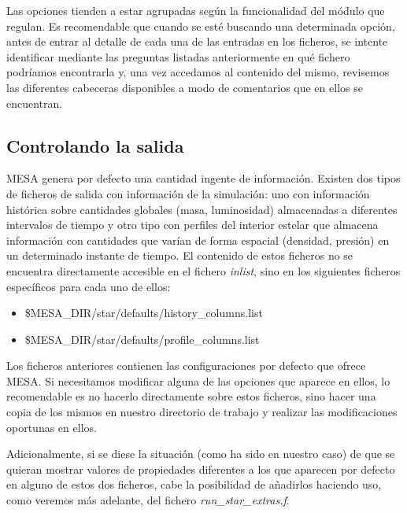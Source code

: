 Las opciones tienden a estar agrupadas según la funcionalidad del módulo que regulan. Es recomendable que cuando se esté buscando una determinada opción, antes de entrar al detalle de cada una de las entradas en los ficheros, se intente identificar mediante las preguntas listadas anteriormente en qué fichero podríamos encontrarla y, una vez accedamos al contenido del mismo, revisemos las diferentes cabeceras disponibles a modo de comentarios que en ellos se encuentran.\par

\subsection{Controlando la salida} \label{sec:ctrl_salida}
MESA genera por defecto una cantidad ingente de información. Existen dos tipos de ficheros de salida con información de la simulación: uno con información histórica sobre cantidades globales (masa, luminosidad) almacenadas a diferentes intervalos de tiempo y otro tipo con perfiles del interior estelar que almacena información con cantidades que varían de forma espacial (densidad, presión) en un determinado instante de tiempo. El contenido de estos ficheros no se encuentra directamente accesible en el fichero \textit{inlist}, sino en los siguientes ficheros específicos para cada uno de ellos:

\begin{itemize}
    \item \$MESA\_DIR/star/defaults/history\_columns.list
    \item \$MESA\_DIR/star/defaults/profile\_columns.list
\end{itemize}

Los ficheros anteriores contienen las configuraciones por defecto que ofrece MESA. Si necesitamos modificar alguna de las opciones que aparece en ellos, lo recomendable es no hacerlo directamente sobre estos ficheros, sino hacer una copia de los mismos en nuestro directorio de trabajo y realizar las modificaciones oportunas en ellos.\par

Adicionalmente, si se diese la situación (como ha sido en nuestro caso) de que se quieran mostrar valores de propiedades diferentes a los que aparecen por defecto en alguno de estos dos ficheros, cabe la posibilidad de añadirlos haciendo uso, como veremos más adelante, del fichero \textit{run\_star\_extras.f}.\par

